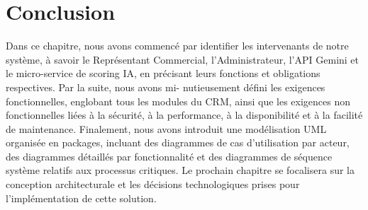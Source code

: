 \section*{Conclusion}

Dans ce chapitre, nous avons commencé par identifier les intervenants de notre système, à savoir le Représentant Commercial, l’Administrateur, l’API Gemini et le micro-service de scoring IA, en précisant leurs fonctions et obligations respectives. Par la suite, nous avons mi-
nutieusement défini les exigences fonctionnelles, englobant tous les modules du CRM, ainsi que les exigences non fonctionnelles liées à la sécurité, à la performance, à la disponibilité et à la facilité de maintenance. Finalement, nous avons introduit une modélisation UML organisée en packages, incluant des diagrammes de cas d’utilisation par acteur, des diagrammes détaillés par fonctionnalité et des diagrammes de séquence système relatifs aux processus critiques. Le prochain chapitre se focalisera sur la conception architecturale et les décisions technologiques prises pour l’implémentation de cette solution.